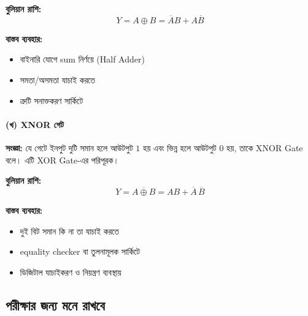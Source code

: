 \textbf{বুলিয়ান রাশি:}
\[
Y=A\oplus B=\overline AB+A\overline B
\]

\textbf{বাস্তব ব্যবহার:}
\begin{itemize}[label={{\bulletfont\textbullet}}, leftmargin=*, nosep]
    \item বাইনারি যোগে \textenglish{sum} নির্ণয়ে (\textenglish{Half Adder})
    \item সমতা/অসমতা যাচাই করতে
    \item ত্রুটি সনাক্তকরণ সার্কিটে
\end{itemize}


\paragraph{(খ) \textenglish{XNOR} গেট}

\textbf{সংজ্ঞা:}
যে গেটে ইনপুট দুটি সমান হলে আউটপুট \(1\) হয় এবং ভিন্ন হলে আউটপুট \(0\) হয়, তাকে \textenglish{XNOR Gate} বলে। এটি \textenglish{XOR Gate}-এর পরিপূরক।

\textbf{বুলিয়ান রাশি:}
\[
Y=\overline{A\oplus B}=AB+\overline A\,\overline B
\]

\textbf{বাস্তব ব্যবহার:}
\begin{itemize}[label={{\bulletfont\textbullet}}, leftmargin=*, nosep]
    \item দুই বিট সমান কি না তা যাচাই করতে
    \item \textenglish{equality checker} বা তুলনামূলক সার্কিটে
    \item ডিজিটাল যাচাইকরণ ও নিয়ন্ত্রণ ব্যবস্থায়
\end{itemize}



\subsection{পরীক্ষার জন্য মনে রাখবে}

